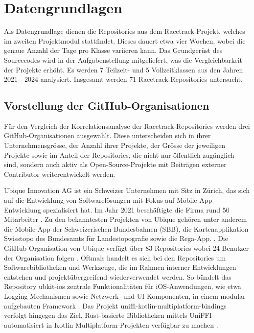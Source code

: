\section{Datengrundlagen}
\label{sec:Datengrundlagen}
Als Datengrundlage dienen die Repositories aus dem Racetrack-Projekt, welches im zweiten Projektmodul stattfindet. Dieses dauert etwa vier Wochen, wobei die genaue Anzahl der Tage pro Klasse variieren kann. Das Grundgerüst des Sourcecodes wird in der Aufgabenstellung mitgeliefert, was die Vergleichbarkeit der Projekte erhöht. Es werden 7 Teilzeit- und 5 Vollzeitklassen aus den Jahren 2021 - 2024 analysiert. Insgesamt werden 71 Racetrack-Repositories untersucht. 

\subsection{Vorstellung der GitHub-Organisationen}
\label{sec:VorstellungGithubOrgs}
Für den Vergleich der Korrelationsanalyse der Racetrack-Repositories werden drei GitHub-Organisationen ausgewählt. Diese unterscheiden sich in ihrer Unternehmensgrösse, der Anzahl ihrer Projekte, der Grösse der jeweiligen Projekte sowie im Anteil der Repositories, die nicht nur öffentlich zugänglich sind, sondern auch aktiv als Open-Source-Projekte mit Beiträgen externer Contributor weiterentwickelt werden.

Ubique Innovation AG ist ein Schweizer Unternehmen mit Sitz in Zürich, das sich auf die Entwicklung von Softwarelösungen mit Fokus auf Mobile-App-Entwicklung spezialisiert hat. Im Jahr 2021 beschäftigte die Firma rund 50 Mitarbeiter \cite{noauthor_mathias_2021}. Zu den bekanntesten Projekten von Ubique gehören unter anderem die Mobile-App der Schweizerischen Bundesbahnen (SBB), die Kartenapplikation Swisstopo des Bundesamts für Landestopografie sowie die Rega-App. \parencite{noauthor_apps_nodate}. Die GitHub-Organisation von Ubique verfügt über 83 Repositories wobei 24 Benutzer der Organisation folgen \parencite{noauthor_ubique_nodate}. Oftmals handelt es sich bei den Repositories um Softwarebibliotheken und Werkzeuge, die im Rahmen interner Entwicklungen entstehen und projektübergreifend wiederverwendet werden. So bündelt das Repository ubkit-ios zentrale Funktionalitäten für iOS-Anwendungen, wie etwa Logging-Mechanismen sowie Netzwerk- und UI-Komponenten, in einem modular aufgebauten Framework \parencite{noauthor_ubiqueinnovationubkit-ios_2025}. Das Projekt uniffi-kotlin-multiplatform-bindings verfolgt hingegen das Ziel, Rust-basierte Bibliotheken mittels UniFFI automatisiert in Kotlin Multiplatform-Projekten verfügbar zu machen \parencite{noauthor_ubiqueinnovationuniffi-kotlin-multiplatform-bindings_nodate}.


